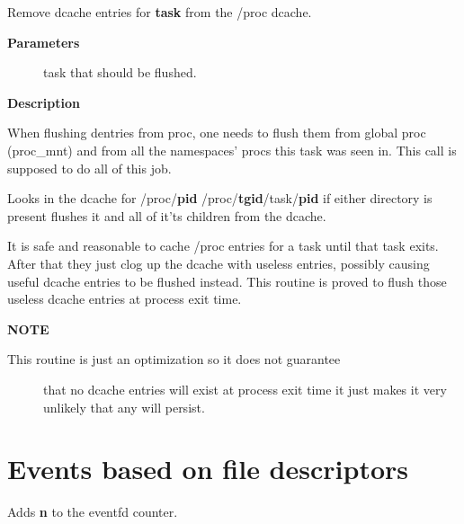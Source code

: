 \documentclass[a4paper,8pt,english]{sphinxmanual}
\begin{document}
\begin{fulllineitems}
\label{filesystems/index:c.proc_flush_task}
Remove dcache entries for \textbf{task} from the /proc dcache.

\end{fulllineitems}


\textbf{Parameters}
\begin{description}
\item[{}] \leavevmode
task that should be flushed.

\end{description}

\textbf{Description}

When flushing dentries from proc, one needs to flush them from global
proc (proc\_mnt) and from all the namespaces' procs this task was seen
in. This call is supposed to do all of this job.

Looks in the dcache for
/proc/\textbf{pid}
/proc/\textbf{tgid}/task/\textbf{pid}
if either directory is present flushes it and all of it'ts children
from the dcache.

It is safe and reasonable to cache /proc entries for a task until
that task exits.  After that they just clog up the dcache with
useless entries, possibly causing useful dcache entries to be
flushed instead.  This routine is proved to flush those useless
dcache entries at process exit time.

\textbf{NOTE}
\begin{description}
\item[{This routine is just an optimization so it does not guarantee}] \leavevmode
that no dcache entries will exist at process exit time it
just makes it very unlikely that any will persist.

\end{description}


\chapter{Events based on file descriptors}
\label{filesystems/index:events-based-on-file-descriptors}

\begin{fulllineitems}
\label{filesystems/index:c.eventfd_signal}
Adds \textbf{n} to the eventfd counter.

\end{fulllineitems}
\end{document}
